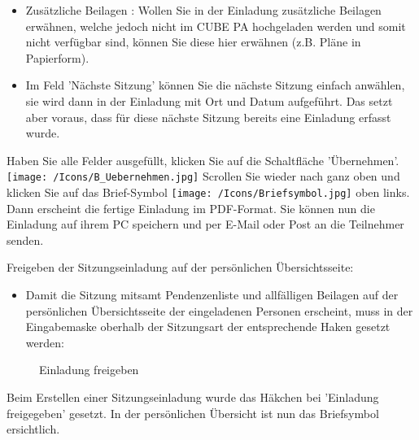 \begin{itemize}
\item 
Zusätzliche Beilagen : Wollen Sie in der Einladung zusätzliche Beilagen erwähnen, welche jedoch nicht im CUBE PA hochgeladen werden und somit nicht verfügbar sind, können Sie diese hier erwähnen (z.B. Pläne in Papierform).
\item 
Im Feld 'Nächste Sitzung' können Sie die nächste Sitzung einfach anwählen, sie wird dann in der Einladung mit Ort und Datum aufgeführt. Das setzt aber voraus, dass für diese nächste Sitzung bereits eine Einladung erfasst wurde.
\end{itemize}

Haben Sie alle Felder ausgefüllt, klicken Sie auf die Schaltfläche 'Übernehmen'. \texttt{[image: /Icons/B\_Uebernehmen.jpg]} \newline
Scrollen Sie wieder nach ganz oben und klicken Sie auf das Brief-Symbol \texttt{[image: /Icons/Briefsymbol.jpg]} oben links. Dann erscheint die fertige Einladung im PDF-Format. Sie können nun die Einladung auf ihrem PC speichern und per E-Mail oder Post an die Teilnehmer senden.

\vspace{\baselineskip}

Freigeben der Sitzungseinladung auf der persönlichen Übersichtsseite:

\begin{itemize}
\item
Damit die Sitzung mitsamt Pendenzenliste und allfälligen Beilagen auf der persönlichen Übersichtsseite der eingeladenen Personen erscheint, muss in der Eingabemaske oberhalb der Sitzungsart der entsprechende Haken gesetzt werden:
\end{itemize}

\begin{figure}[H]
\caption{Einladung freigeben}
\end{figure}

\begin{small}
Beim Erstellen einer Sitzungseinladung wurde das Häkchen bei 'Einladung freigegeben' gesetzt. In der persönlichen Übersicht ist nun das Briefsymbol ersichtlich.
\end{small}

